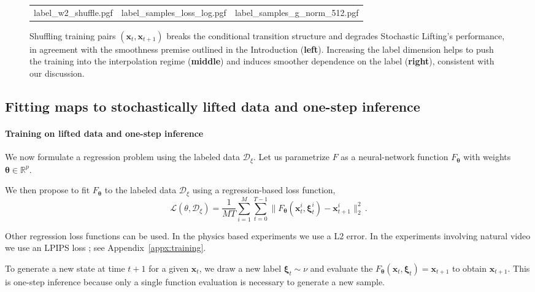 \documentclass{article}
\theoremstyle{plain}
\theoremstyle{definition}
\theoremstyle{remark}
\newcommand{\bfxi}{{\bm \xi}}
\newcommand{\bftheta}{\bm{\theta}}
\newcommand{\map}{F_{\bftheta}}
\newcommand{\x}{\bm{x}}
\newcommand{\bfx}{\bm{x}}
\begin{document}
\begin{figure}[t]
  \centering
  \begin{tabular}{lll}
    {label_w2_shuffle.pgf}       &
    {label_samples_loss_log.pgf} &
    {label_samples_g_norm_512.pgf}
  \end{tabular}
  \caption{Shuffling training pairs $(\x_t, \x_{t + 1})$ breaks the conditional transition structure and  degrades Stochastic Lifting's performance, in agreement with the smoothness premise outlined in the Introduction (\textbf{left}). Increasing the label dimension helps to push the training into the interpolation regime (\textbf{middle}) and induces smoother dependence on the label  (\textbf{right}), consistent with our discussion.}
  \label{fig:sdestudy}
\end{figure}

\subsection{Fitting maps to stochastically lifted data and one-step inference}\label{sec:Learning:FittingRegLoss}
\paragraph{Training on lifted data and one-step inference}

We now formulate a regression problem using the labeled data $\mathcal{D}_{\xi}$. Let us parametrize $F$ as a neural-network function $F_{\bftheta}$ with weights $\bftheta \in \mathbb{R}^p$.

We then propose to fit $F_{\bftheta}$ to the labeled data $\mathcal{D}_{\xi}$ using a regression-based loss function,
\begin{equation}
  \label{eq:MSELoss}
  \mathcal{L}(\theta, \mathcal{D}_{\xi})=\frac{1}{M T}\sum\limits_{i = 1}^M\sum\limits_{t = 0}^{T-1} \|\map(\x_t^i, \bfxi_t^i) - \x_{t + 1}^i\|_2^2\,.
\end{equation}

Other regression loss functions can be used. In the physics based experiments we use a L2 error. In the experiments involving natural video we use an LPIPS loss \cite{zhang2018unreasonable}; see Appendix~\ref{appx:training}.

To generate a new state at time $t + 1$ for a given $\x_t$, we draw a new label $\bfxi_t \sim \nu$ and evaluate the $F_{\bftheta}(\x_t, \bfxi_t) = \bfx_{t + 1}$ to obtain $\bfx_{t + 1}$. This is one-step inference because only a single function evaluation is necessary to generate a new sample.
\end{document}
